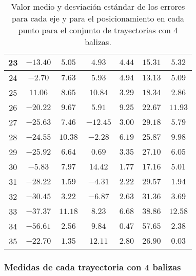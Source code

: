 \begin{table}[H]
\begin{tabular}{|c|c|c|c|c|c|c|}
        23   &  $-13.40$  &  $5.05$   &   $4.93$    &   $4.44$  &  $15.31$  & $5.32$   \\ \hline
        24   &  $-2.70$   &  $7.63$   &   $5.93$    &   $4.94$  &  $13.13$  & $5.09$   \\ \hline
        25   &  $11.06$   &  $8.65$   &   $10.84$   &   $3.29$  &  $18.34$  & $2.86$   \\ \hline
        26   &  $-20.22$  &  $9.67$   &   $5.91$    &   $9.25$  &  $22.67$  & $11.93$  \\ \hline
        27   &  $-25.63$  &  $7.46$   &   $-12.45$  &   $3.00$  &  $29.18$  & $5.79$   \\ \hline
        28   &  $-24.55$  &  $10.38$  &   $-2.28$   &   $6.19$  &  $25.87$  & $9.98$   \\ \hline
        29   &  $-25.92$  &  $6.64$   &   $0.69$    &   $3.35$  &  $27.10$  & $6.05$   \\ \hline
        30   &  $-5.83$   &  $7.97$   &   $14.42$   &   $1.77$  &  $17.16$  & $5.01$   \\ \hline
        31   &  $-28.22$  &  $1.59$   &   $-4.31$   &   $2.22$  &  $29.57$  & $1.94$   \\ \hline
        32   &  $-30.45$  &  $3.22$   &   $-6.87$   &   $2.63$  &  $31.36$  & $3.69$   \\ \hline
        33   &  $-37.37$  &  $11.18$  &   $8.23$    &   $6.68$  &  $38.86$  & $12.58$  \\ \hline
        34   &  $-56.61$  &  $2.56$   &   $9.84$    &   $0.47$  &  $57.65$  & $2.38$   \\ \hline
        35   &  $-22.70$  &  $1.35$   &   $12.11$   &   $2.80$  &  $26.90$  & $0.03$   \\ \hline
    \end{tabular}
    \caption{Valor medio y desviación estándar de los errores para cada eje y para el posicionamiento en cada punto para el conjunto de trayectorias con 4 balizas.}
    \label{tab:media_lab_4_total}
\end{table}

\newpage
\subsubsection{Medidas de cada trayectoria con 4 balizas}


